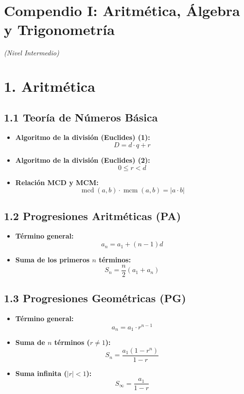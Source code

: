 \documentclass[11pt,a4paper]{article}
\begin{document}
\section*{Compendio I: Aritmética, Álgebra y Trigonometría}

\textit{(Nivel Intermedio)}

\section*{1. Aritmética}

\subsection*{1.1 Teoría de Números Básica}

\begin{itemize}
  \item \textbf{Algoritmo de la división (Euclides) (1):}
  \[
    D = d \cdot q + r
  \]
  \item \textbf{Algoritmo de la división (Euclides) (2):}
  \[
    0 \le r < d
  \]
  \item \textbf{Relación MCD y MCM:}
  \[
    \operatorname{mcd}(a, b) \cdot \operatorname{mcm}(a, b) = |a \cdot b|
  \]
\end{itemize}

\subsection*{1.2 Progresiones Aritméticas (PA)}

\begin{itemize}
  \item \textbf{Término general:}
  \[
    a_n = a_1 + (n - 1)d
  \]
  \item \textbf{Suma de los primeros $n$ términos:}
  \[
    S_n = \frac{n}{2} (a_1 + a_n)
  \]
\end{itemize}

\subsection*{1.3 Progresiones Geométricas (PG)}

\begin{itemize}
  \item \textbf{Término general:}
  \[
    a_n = a_1 \cdot r^{n - 1}
  \]
  \item \textbf{Suma de $n$ términos ($r \ne 1$):}
  \[
    S_n = \frac{a_1 (1 - r^n)}{1 - r}
  \]
  \item \textbf{Suma infinita ($|r| < 1$):}
  \[
    S_\infty = \frac{a_1}{1 - r}
  \]
\end{itemize}
\end{document}
